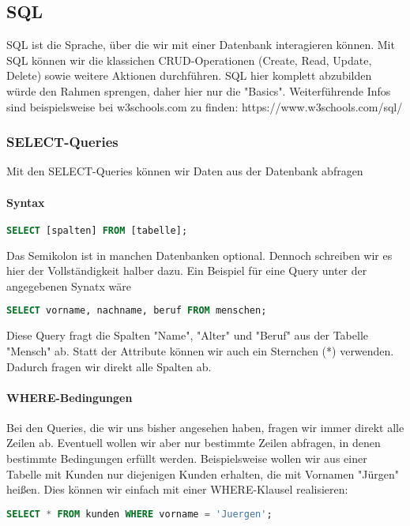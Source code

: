 \documentclass{article}
\begin{document}
	\subsection{SQL}
	SQL ist die Sprache, über die wir mit einer Datenbank interagieren können. Mit SQL können wir die klassichen CRUD-Operationen (Create, Read, Update, Delete) sowie weitere Aktionen durchführen. SQL hier komplett abzubilden würde den Rahmen sprengen, daher hier nur die "Basics". Weiterführende Infos sind beispielsweise bei w3schools.com zu finden: https://www.w3schools.com/sql/

	\subsubsection{SELECT-Queries}
	Mit den SELECT-Queries können wir Daten aus der Datenbank abfragen
	
	\paragraph{Syntax}
	\begin{lstlisting}[language=SQL]
	SELECT [spalten] FROM [tabelle]; 
	\end{lstlisting}
	Das Semikolon ist in manchen Datenbanken optional. Dennoch schreiben wir es hier der Vollständigkeit halber dazu. Ein Beispiel für eine Query unter der angegebenen Synatx wäre

	\begin{lstlisting}[language=SQL]
	SELECT vorname, nachname, beruf FROM menschen;
	\end{lstlisting}

	Diese Query fragt die Spalten "Name", "Alter" und "Beruf" aus der Tabelle "Mensch" ab.
	Statt der Attribute können wir auch ein Sternchen (*) verwenden. Dadurch fragen wir direkt alle Spalten ab.

	\paragraph{WHERE-Bedingungen}
	Bei den Queries, die wir uns bisher angesehen haben, fragen wir immer direkt alle Zeilen ab. Eventuell wollen wir aber nur bestimmte Zeilen abfragen, in denen bestimmte Bedingungen erfüllt werden. Beispielsweise wollen wir aus einer Tabelle mit Kunden nur diejenigen Kunden erhalten, die mit Vornamen "Jürgen" heißen. Dies können wir einfach mit einer WHERE-Klausel realisieren:

	\begin{lstlisting}[language=SQL]
	SELECT * FROM kunden WHERE vorname = 'Juergen';
	\end{lstlisting}
\end{document}
